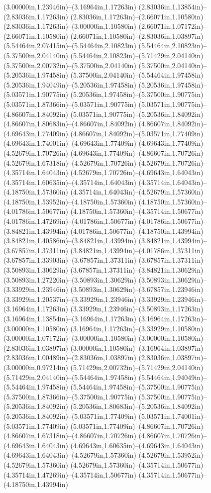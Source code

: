 (3.00000in,1.23946in)--(3.16964in,1.17263in) (2.83036in,1.13854in)--(2.83036in,1.17263in) (2.83036in,1.17263in)--(2.66071in,1.10580in) (2.83036in,1.17263in)--(3.00000in,1.10580in) (2.66071in,1.07172in)--(2.66071in,1.10580in) (2.66071in,1.10580in)--(2.83036in,1.03897in) (5.54464in,2.07415in)--(5.54464in,2.10823in) (5.54464in,2.10823in)--(5.37500in,2.04140in) (5.54464in,2.10823in)--(5.71429in,2.04140in) (5.37500in,2.00732in)--(5.37500in,2.04140in) (5.37500in,2.04140in)--(5.20536in,1.97458in) (5.37500in,2.04140in)--(5.54464in,1.97458in) (5.20536in,1.94049in)--(5.20536in,1.97458in) (5.20536in,1.97458in)--(5.03571in,1.90775in) (5.20536in,1.97458in)--(5.37500in,1.90775in) (5.03571in,1.87366in)--(5.03571in,1.90775in) (5.03571in,1.90775in)--(4.86607in,1.84092in) (5.03571in,1.90775in)--(5.20536in,1.84092in) (4.86607in,1.80683in)--(4.86607in,1.84092in) (4.86607in,1.84092in)--(4.69643in,1.77409in) (4.86607in,1.84092in)--(5.03571in,1.77409in) (4.69643in,1.74001in)--(4.69643in,1.77409in) (4.69643in,1.77409in)--(4.52679in,1.70726in) (4.69643in,1.77409in)--(4.86607in,1.70726in) (4.52679in,1.67318in)--(4.52679in,1.70726in) (4.52679in,1.70726in)--(4.35714in,1.64043in) (4.52679in,1.70726in)--(4.69643in,1.64043in) (4.35714in,1.60635in)--(4.35714in,1.64043in) (4.35714in,1.64043in)--(4.18750in,1.57360in) (4.35714in,1.64043in)--(4.52679in,1.57360in) (4.18750in,1.53952in)--(4.18750in,1.57360in) (4.18750in,1.57360in)--(4.01786in,1.50677in) (4.18750in,1.57360in)--(4.35714in,1.50677in) (4.01786in,1.47269in)--(4.01786in,1.50677in) (4.01786in,1.50677in)--(3.84821in,1.43994in) (4.01786in,1.50677in)--(4.18750in,1.43994in) (3.84821in,1.40586in)--(3.84821in,1.43994in) (3.84821in,1.43994in)--(3.67857in,1.37311in) (3.84821in,1.43994in)--(4.01786in,1.37311in) (3.67857in,1.33903in)--(3.67857in,1.37311in) (3.67857in,1.37311in)--(3.50893in,1.30629in) (3.67857in,1.37311in)--(3.84821in,1.30629in) (3.50893in,1.27220in)--(3.50893in,1.30629in) (3.50893in,1.30629in)--(3.33929in,1.23946in) (3.50893in,1.30629in)--(3.67857in,1.23946in) (3.33929in,1.20537in)--(3.33929in,1.23946in) (3.33929in,1.23946in)--(3.16964in,1.17263in) (3.33929in,1.23946in)--(3.50893in,1.17263in) (3.16964in,1.13854in)--(3.16964in,1.17263in) (3.16964in,1.17263in)--(3.00000in,1.10580in) (3.16964in,1.17263in)--(3.33929in,1.10580in) (3.00000in,1.07172in)--(3.00000in,1.10580in) (3.00000in,1.10580in)--(2.83036in,1.03897in) (3.00000in,1.10580in)--(3.16964in,1.03897in) (2.83036in,1.00489in)--(2.83036in,1.03897in) (2.83036in,1.03897in)--(3.00000in,0.97214in) (5.71429in,2.00732in)--(5.71429in,2.04140in) (5.71429in,2.04140in)--(5.54464in,1.97458in) (5.54464in,1.94049in)--(5.54464in,1.97458in) (5.54464in,1.97458in)--(5.37500in,1.90775in) (5.37500in,1.87366in)--(5.37500in,1.90775in) (5.37500in,1.90775in)--(5.20536in,1.84092in) (5.20536in,1.80683in)--(5.20536in,1.84092in) (5.20536in,1.84092in)--(5.03571in,1.77409in) (5.03571in,1.74001in)--(5.03571in,1.77409in) (5.03571in,1.77409in)--(4.86607in,1.70726in) (4.86607in,1.67318in)--(4.86607in,1.70726in) (4.86607in,1.70726in)--(4.69643in,1.64043in) (4.69643in,1.60635in)--(4.69643in,1.64043in) (4.69643in,1.64043in)--(4.52679in,1.57360in) (4.52679in,1.53952in)--(4.52679in,1.57360in) (4.52679in,1.57360in)--(4.35714in,1.50677in) (4.35714in,1.47269in)--(4.35714in,1.50677in) (4.35714in,1.50677in)--(4.18750in,1.43994in) 